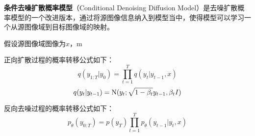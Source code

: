 
\textbf{条件去噪扩散概率模型}（Conditional Denoising Diffusion Model）是去噪扩散概率模型的一个改进版本，通过将源图像信息纳入到模型当中，使得模型可以学习一个从源图像域到目标图像域的映射。

假设源图像域图像为$x$，m

正向扩散过程的概率转移公式如下：
\begin{equation}
q({y_{1:T}}|{y_0}) = \prod\limits_{t = 1}^T {q({y_t}|{y_{t - 1},x})}
\end{equation}
\begin{equation}
q({y_t}|{y_{t - 1}}) = {\rm{N}}({y_t};\sqrt {1 - {\beta _t}} {y_{t - 1}},{\beta _t}I)
\end{equation}

反向去噪过程的概率转移公式如下：
\begin{equation}
{p_\theta }({y_{0:T}}) = p({y_T})\prod\limits_{t = 1}^T {{p_\theta }({y_{t - 1}}|{y_t,x})}
\end{equation}